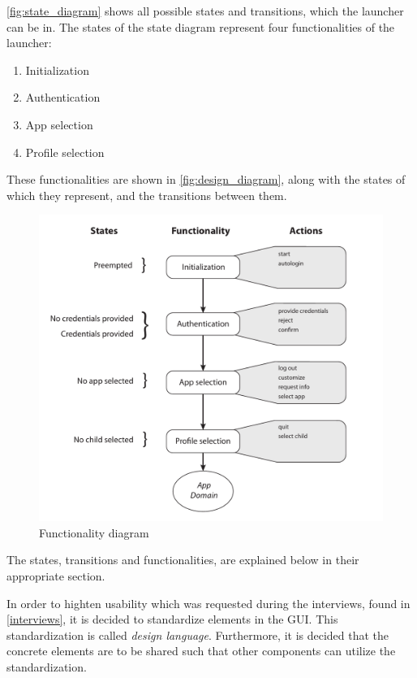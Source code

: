 \autoref{fig:state_diagram} shows all possible states and transitions, which the launcher can be in. 
The states of the state diagram represent four functionalities of the launcher:

\begin{enumerate}
	\item Initialization
	\item Authentication
	\item App selection
	\item Profile selection
\end{enumerate}


These functionalities are shown in \autoref{fig:design_diagram}, along with the states of which they represent, and the transitions between them.



\begin{figure}[h]
	\centering
	\includegraphics[width=1\textwidth]{gfx/design_diagram.pdf}
	\caption{Functionality diagram}
	\label{fig:design_diagram}
\end{figure}

The states, transitions and functionalities, are explained below in their appropriate section.

In order to highten usability which was requested during the interviews, found in \autoref{interviews}, it is decided to standardize elements in the GUI. This standardization is called \emph{design language}.
Furthermore, it is decided that the concrete elements are to be shared such that other \giraf[] components can utilize the standardization.
